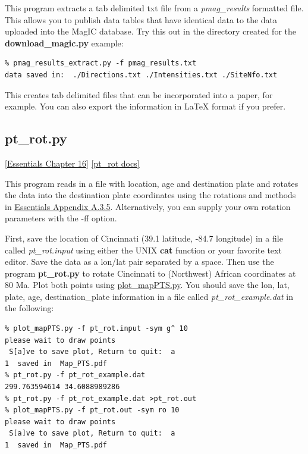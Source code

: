 \documentclass[11pt]{book}
\begin{document}
{{This program extracts a tab delimited txt file from a {\it pmag\_results} formatted file.   This allows you to publish data tables that have identical data to the data uploaded into the MagIC database.    Try this out in the directory created for the {\bf download\_magic.py} example:

\begin{verbatim}
% pmag_results_extract.py -f pmag_results.txt
data saved in:  ./Directions.txt ./Intensities.txt ./SiteNfo.txt
\end{verbatim}

This creates tab delimited files that can be incorporated into a paper, for example.   You can also export the information in LaTeX format if you prefer.





\subsection{pt\_rot.py}
\href{http://earthref.org/MAGIC/books/Tauxe/Essentials/WebBook3ch16.html#ch16}{[Essentials Chapter 16]}
\href{https://github.com/PmagPy/PmagPy/blob/master/programs/pt_rot.py}{[pt\_rot docs]}

This program reads in a file with location, age and destination plate and rotates the data into the destination plate coordinates using the rotations and methods in \href{http://earthref.org/MAGIC/books/Tauxe/Essentials/WebBook3ap1.html#polerot}{Essentials Appendix A.3.5}.  Alternatively, you can supply your own rotation parameters with the -ff option.

First, save  the location of Cincinnati (39.1 latitude, -84.7 longitude) in a file called {\it pt\_rot.input} using either the UNIX {\bf cat} function or your favorite text editor.  Save the data as a lon/lat pair separated by a space.  Then use the program {\bf pt\_rot.py} to rotate Cincinnati to (Northwest) African coordinates at 80 Ma.  Plot both points using \href{#plot_mapPTS.py}{plot\_mapPTS.py}.   You should save the lon, lat, plate, age, destination\_plate information in a file called {\it pt\_rot\_example.dat} in the following:

\begin{verbatim}
% plot_mapPTS.py -f pt_rot.input -sym g^ 10
please wait to draw points
 S[a]ve to save plot, Return to quit:  a
1  saved in  Map_PTS.pdf
% pt_rot.py -f pt_rot_example.dat
299.763594614 34.6088989286
% pt_rot.py -f pt_rot_example.dat >pt_rot.out
% plot_mapPTS.py -f pt_rot.out -sym ro 10
please wait to draw points
 S[a]ve to save plot, Return to quit:  a
1  saved in  Map_PTS.pdf
\end{verbatim}

}}
\end{document}
